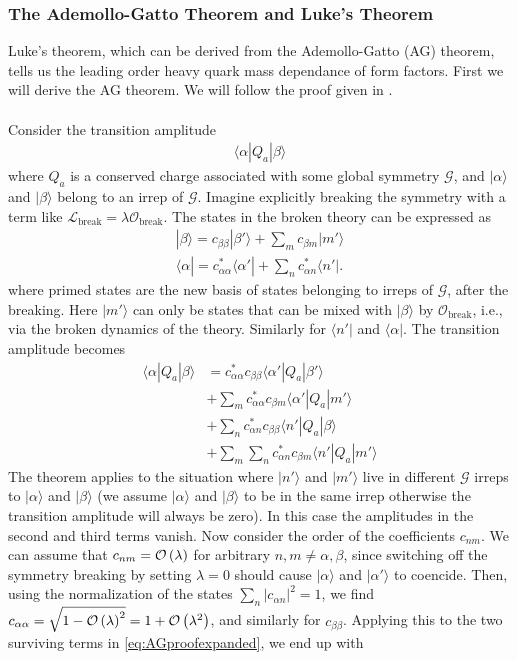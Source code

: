 \subsubsection{The Ademollo-Gatto Theorem and Luke's Theorem}

Luke's theorem, which can be derived from the Ademollo-Gatto (AG) theorem, tells us the leading order heavy quark mass dependance of form factors. First we will derive the AG theorem. We will follow the proof given in \cite{Lebed:1991sq}.
\\ \\
Consider the transition amplitude
\begin{align}
	\langle \alpha | Q_a | \beta \rangle
\end{align}
where $Q_a$ is a conserved charge associated with some global symmetry $\mathcal{G}$, and $|\alpha\rangle$ and $|\beta\rangle$ belong to an irrep of $\mathcal{G}$. Imagine explicitly breaking the symmetry with a term like $\mathscr{L}_{\text{break}} = \lambda \mathcal{O}_{\text{break}}$. The states in the broken theory can be expressed as
\begin{align}
	|\beta \rangle = c_{\beta\beta} | \beta' \rangle + \sum_{m} c_{\beta m} | m' \rangle \\
	\langle \alpha | = c^*_{\alpha\alpha} \langle \alpha' | + \sum_{n} c^*_{\alpha n} \langle n' |.
\end{align}
where primed states are the new basis of states belonging to irreps of $\mathcal{G}$, after the breaking. Here $|m'\rangle$ can only be states that can be mixed with $| \beta \rangle$ by $\mathcal{O}_{\text{break}}$, i.e., via the broken dynamics of the theory. Similarly for $\langle n' |$ and $\langle \alpha |$. The transition amplitude becomes
\begin{align}
\nonumber
	\langle \alpha | Q_a | \beta \rangle
	 	&= c_{\alpha\alpha}^* c_{\beta\beta} \langle \alpha' | Q_a | \beta' \rangle \\ 
	 	\nonumber
	 	&+ \sum_m c_{\alpha\alpha}^* c_{\beta m} \langle \alpha' | Q_a | m' \rangle \\
	 	\nonumber 
	 	&+ \sum_n c_{\alpha n}^* c_{\beta \beta} \langle n' | Q_a | \beta \rangle \\ 
	 	&+ \sum_m\sum_n c_{\alpha n}^* c_{\beta m} \langle n' | Q_a | m' \rangle
	 	\label{eq:AGproofexpanded}
\end{align}
The theorem applies to the situation where $|n'\rangle$ and $|m'\rangle$ live in different $\mathcal{G}$ irreps to $|\alpha\rangle$ and $|\beta \rangle$ (we assume $|\alpha\rangle$ and $|\beta \rangle$ to be in the same irrep otherwise the transition amplitude will always be zero). In this case the amplitudes in the second and third terms vanish. Now consider the order of the coefficients $c_{nm}$. We can assume that $c_{nm} = \mathcal{O}\left( \lambda \right)$ for arbitrary $n,m \neq \alpha,\beta$, since switching off the symmetry breaking by setting $\lambda=0$ should cause $|\alpha\rangle $ and $|\alpha'\rangle$ to coencide. Then, using the normalization of the states $\sum_{n} |c_{\alpha n} |^2 = 1$, we find $c_{\alpha\alpha} = \sqrt{1 - \mathcal{O}\left( \lambda \right)^2} = 1 + \mathcal{O}\left( \lambda^2 \right)$, and similarly for $c_{\beta\beta}$. Applying this to the two surviving terms in \eqref{eq:AGproofexpanded}, we end up with
